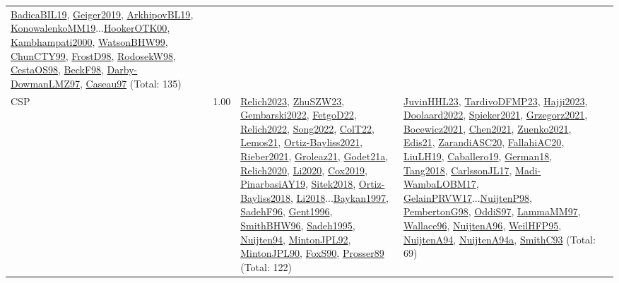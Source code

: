 {\begin{longtable}{p{3cm}r>{\raggedright\arraybackslash}p{6cm}>{\raggedright\arraybackslash}p{6cm}>{\raggedright\arraybackslash}p{8cm}}
\hyperref[detail:BadicaBIL19]{BadicaBIL19}, \hyperref[detail:Geiger2019]{Geiger2019}, \hyperref[detail:ArkhipovBL19]{ArkhipovBL19}, \hyperref[detail:KonowalenkoMM19]{KonowalenkoMM19}...\hyperref[detail:HookerOTK00]{HookerOTK00}, \hyperref[detail:Kambhampati2000]{Kambhampati2000}, \hyperref[detail:WatsonBHW99]{WatsonBHW99}, \hyperref[detail:ChunCTY99]{ChunCTY99}, \hyperref[detail:FrostD98]{FrostD98}, \hyperref[detail:RodosekW98]{RodosekW98}, \hyperref[detail:CestaOS98]{CestaOS98}, \hyperref[detail:BeckF98]{BeckF98}, \hyperref[detail:Darby-DowmanLMZ97]{Darby-DowmanLMZ97}, \hyperref[detail:Caseau97]{Caseau97} (Total: 135)\\
\index{CSP}\index{CP!CSP}CSP &  1.00 & \hyperref[detail:Relich2023]{Relich2023}, \hyperref[detail:ZhuSZW23]{ZhuSZW23}, \hyperref[detail:Gembarski2022]{Gembarski2022}, \hyperref[detail:FetgoD22]{FetgoD22}, \hyperref[detail:Relich2022]{Relich2022}, \hyperref[detail:Song2022]{Song2022}, \hyperref[detail:ColT22]{ColT22}, \hyperref[detail:Lemos21]{Lemos21}, \hyperref[detail:Ortiz-Bayliss2021]{Ortiz-Bayliss2021}, \hyperref[detail:Rieber2021]{Rieber2021}, \hyperref[detail:Groleaz21]{Groleaz21}, \hyperref[detail:Godet21a]{Godet21a}, \hyperref[detail:Relich2020]{Relich2020}, \hyperref[detail:Li2020]{Li2020}, \hyperref[detail:Cox2019]{Cox2019}, \hyperref[detail:PinarbasiAY19]{PinarbasiAY19}, \hyperref[detail:Sitek2018]{Sitek2018}, \hyperref[detail:Ortiz-Bayliss2018]{Ortiz-Bayliss2018}, \hyperref[detail:Li2018]{Li2018}...\hyperref[detail:Baykan1997]{Baykan1997}, \hyperref[detail:SadehF96]{SadehF96}, \hyperref[detail:Gent1996]{Gent1996}, \hyperref[detail:SmithBHW96]{SmithBHW96}, \hyperref[detail:Sadeh1995]{Sadeh1995}, \hyperref[detail:Nuijten94]{Nuijten94}, \hyperref[detail:MintonJPL92]{MintonJPL92}, \hyperref[detail:MintonJPL90]{MintonJPL90}, \hyperref[detail:FoxS90]{FoxS90}, \hyperref[detail:Prosser89]{Prosser89} (Total: 122) & \hyperref[detail:JuvinHHL23]{JuvinHHL23}, \hyperref[detail:TardivoDFMP23]{TardivoDFMP23}, \hyperref[detail:Hajji2023]{Hajji2023}, \hyperref[detail:Doolaard2022]{Doolaard2022}, \hyperref[detail:Spieker2021]{Spieker2021}, \hyperref[detail:Grzegorz2021]{Grzegorz2021}, \hyperref[detail:Bocewicz2021]{Bocewicz2021}, \hyperref[detail:Chen2021]{Chen2021}, \hyperref[detail:Zuenko2021]{Zuenko2021}, \hyperref[detail:Edis21]{Edis21}, \hyperref[detail:ZarandiASC20]{ZarandiASC20}, \hyperref[detail:FallahiAC20]{FallahiAC20}, \hyperref[detail:LiuLH19]{LiuLH19}, \hyperref[detail:Caballero19]{Caballero19}, \hyperref[detail:German18]{German18}, \hyperref[detail:Tang2018]{Tang2018}, \hyperref[detail:CarlssonJL17]{CarlssonJL17}, \hyperref[detail:Madi-WambaLOBM17]{Madi-WambaLOBM17}, \hyperref[detail:GelainPRVW17]{GelainPRVW17}...\hyperref[detail:NuijtenP98]{NuijtenP98}, \hyperref[detail:PembertonG98]{PembertonG98}, \hyperref[detail:OddiS97]{OddiS97}, \hyperref[detail:LammaMM97]{LammaMM97}, \hyperref[detail:Wallace96]{Wallace96}, \hyperref[detail:NuijtenA96]{NuijtenA96}, \hyperref[detail:WeilHFP95]{WeilHFP95}, \hyperref[detail:NuijtenA94]{NuijtenA94}, \hyperref[detail:NuijtenA94a]{NuijtenA94a}, \hyperref[detail:SmithC93]{SmithC93} (Total: 69) & 
\end{longtable}}
